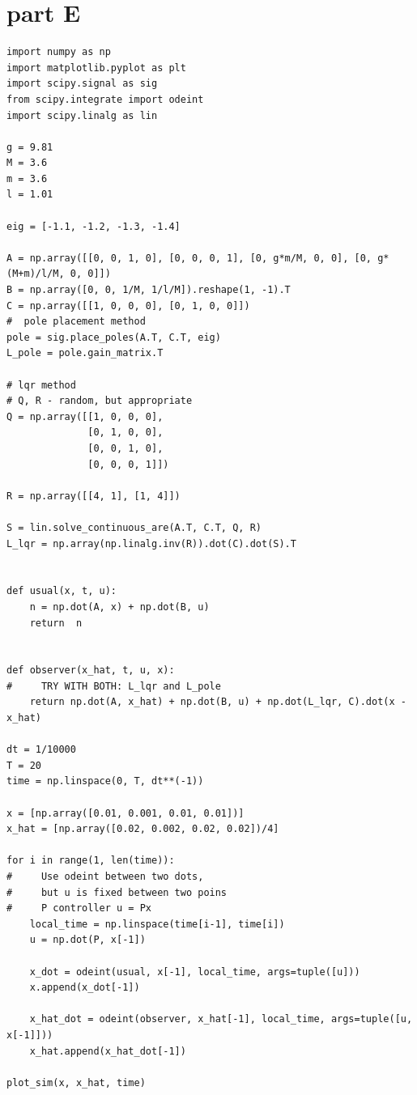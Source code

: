 \documentclass[a4paper,11pt]{article}
\makeatletter
\newcommand{\problemquestion}[1]{\gdef\@problemquestion{#1}}%
\newcommand{\problemsolution}[1]{\gdef\@problemsolution{#1}}%
\theoremstyle{mytheor}
\makeatother
\begin{document}
\section*{part E}
\begin{problem}
  \problemquestion{Simulate nonlinear system with Luenberger observer and state feedback controller that uses estimated states ($u = K \hat{x}$). Make sure that the system is stabilized for various initial conditions around $\bar{z}$..}
  \problemsolution{}
\end{problem}

\begin{lstlisting}
import numpy as np
import matplotlib.pyplot as plt
import scipy.signal as sig
from scipy.integrate import odeint
import scipy.linalg as lin

g = 9.81
M = 3.6
m = 3.6
l = 1.01

eig = [-1.1, -1.2, -1.3, -1.4]

A = np.array([[0, 0, 1, 0], [0, 0, 0, 1], [0, g*m/M, 0, 0], [0, g*(M+m)/l/M, 0, 0]])
B = np.array([0, 0, 1/M, 1/l/M]).reshape(1, -1).T
C = np.array([[1, 0, 0, 0], [0, 1, 0, 0]])
#  pole placement method
pole = sig.place_poles(A.T, C.T, eig)
L_pole = pole.gain_matrix.T

# lqr method
# Q, R - random, but appropriate
Q = np.array([[1, 0, 0, 0], 
              [0, 1, 0, 0], 
              [0, 0, 1, 0], 
              [0, 0, 0, 1]])

R = np.array([[4, 1], [1, 4]]) 

S = lin.solve_continuous_are(A.T, C.T, Q, R)
L_lqr = np.array(np.linalg.inv(R)).dot(C).dot(S).T


def usual(x, t, u):
    n = np.dot(A, x) + np.dot(B, u)
    return  n


def observer(x_hat, t, u, x):
#     TRY WITH BOTH: L_lqr and L_pole
    return np.dot(A, x_hat) + np.dot(B, u) + np.dot(L_lqr, C).dot(x - x_hat)

dt = 1/10000
T = 20
time = np.linspace(0, T, dt**(-1))

x = [np.array([0.01, 0.001, 0.01, 0.01])]
x_hat = [np.array([0.02, 0.002, 0.02, 0.02])/4]

for i in range(1, len(time)):
#     Use odeint between two dots,
#     but u is fixed between two poins
#     P controller u = Px
    local_time = np.linspace(time[i-1], time[i])
    u = np.dot(P, x[-1])

    x_dot = odeint(usual, x[-1], local_time, args=tuple([u]))
    x.append(x_dot[-1])
    
    x_hat_dot = odeint(observer, x_hat[-1], local_time, args=tuple([u, x[-1]]))
    x_hat.append(x_hat_dot[-1])

plot_sim(x, x_hat, time)

\end{lstlisting}
\end{document}
